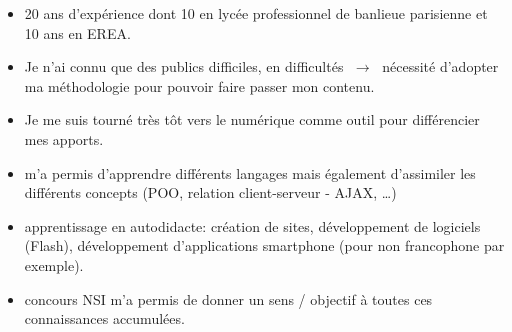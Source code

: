 \documentclass[a4paper,11pt]{article}
\begin{document}
\begin{itemize}
    \item 20 ans d'expérience dont 10 en lycée professionnel de banlieue parisienne et 10 ans en EREA.
    \item Je n'ai connu que des publics difficiles, en difficultés $\;\rightarrow\;$ nécessité d'adopter ma méthodologie pour pouvoir faire passer mon contenu.
    \item Je me suis tourné très tôt vers le numérique comme outil pour différencier mes apports.
    \item m'a permis d'apprendre différents langages mais également d'assimiler les différents concepts (POO, relation client-serveur - AJAX, \dots)
    \item apprentissage en autodidacte: création de sites, développement de logiciels (Flash), développement d'applications smartphone (pour non francophone par exemple).
    \item concours NSI m'a permis de donner un sens / objectif à toutes ces connaissances accumulées.
\end{itemize}
\end{document}
